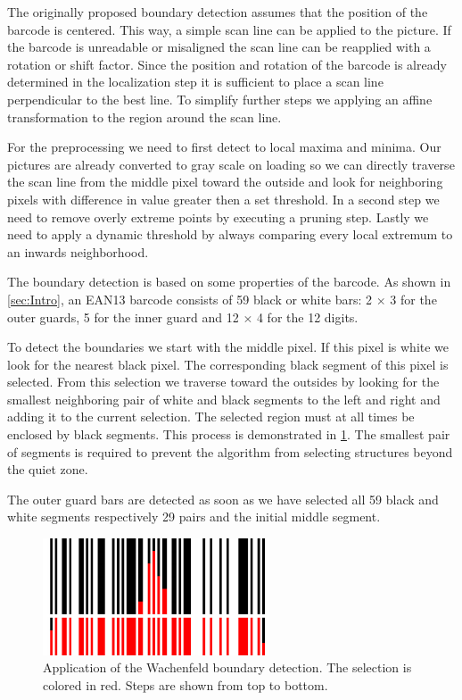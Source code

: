 The originally proposed boundary detection assumes that the position of the barcode is centered. This way, a simple scan line can be applied to the picture. If the barcode is unreadable or misaligned the scan line can be reapplied with a rotation or shift factor. Since the position and rotation of the barcode is already determined in the localization step it is sufficient to place a scan line perpendicular to the best line. To simplify further steps we applying an affine transformation to the region around the scan line.

For the preprocessing we need to first detect to local maxima and minima. Our pictures are already converted to gray scale on loading so we can directly traverse the scan line from the middle pixel toward the outside and look for neighboring pixels with difference in value greater then a set threshold. In a second step we need to remove overly extreme points by executing a pruning step. Lastly we need to apply a dynamic threshold by always comparing every local extremum to an inwards neighborhood.

The boundary detection is based on some properties of the barcode. As shown in
\cref{sec:Intro}, an EAN13 barcode consists of 59 black or white bars: 2 $\times$ 3 for the outer guards, 5 for the inner guard and 12 $\times$ 4 for the 12 digits.

To detect the boundaries we start with the middle pixel. If this pixel is white
we look for the nearest black pixel. The corresponding black segment of this
pixel is selected. From this selection we traverse toward the outsides by
looking for the smallest neighboring pair of white and black segments to the
left and right and adding it to the current selection. The selected region must
at all times be enclosed by black segments. This process is demonstrated in
\cref{wachenfeld}. The smallest pair of segments is required to prevent the
algorithm from selecting structures beyond the quiet zone.

The outer guard bars are detected as soon as we have selected all 59 black and white segments respectively 29 pairs and the initial middle segment.

\begin{figure}[t]
\center
\includegraphics[width=0.6\textwidth,natwidth=900,natheight=463]{img/wachenfeld.png}
\caption{Application of the Wachenfeld boundary detection. The selection is colored in red. Steps are shown from top to bottom.}
\label{wachenfeld}
\end{figure}



